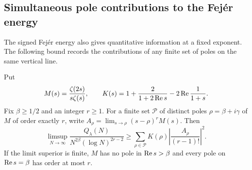 \subsection{Simultaneous pole contributions to the Fej\'er energy}
\label{ssec:fejer-multipole}

The signed Fej\'er energy also gives quantitative information at a
fixed exponent. The following bound records the contributions of any
finite set of poles on the same vertical line.

\begin{proposition}\label{prop:fejer-multipole}
Put
\[
 M(s)=\frac{\zeta(2s)}{s\zeta(s)},\qquad
 K(s)=1+\frac{2}{1+2\operatorname{Re} s}-2\operatorname{Re}\frac1{1+s}.
\]
Fix \(\beta\ge1/2\) and an integer \(r\ge1\). For a finite set
\(\mathcal P\) of distinct poles \(\rho=\beta+i\gamma\) of \(M\)
of order exactly \(r\), write
\(A_\rho=\lim_{s\to\rho}(s-\rho)^rM(s)\). Then
\begin{equation}\label{eq:fejer-multipole}
 \limsup_{N\to\infty}
  \frac{Q_\lambda(N)}{N^{2\beta}(\log N)^{2r-2}}
 \ge \sum_{\rho\in\mathcal P}K(\rho)
              \left|\frac{A_\rho}{(r-1)!}\right|^2.
\end{equation}
If the limit superior is finite, \(M\) has no pole in
\(\operatorname{Re} s>\beta\) and every pole on \(\operatorname{Re} s=\beta\) has order at
most \(r\).
\end{proposition}

